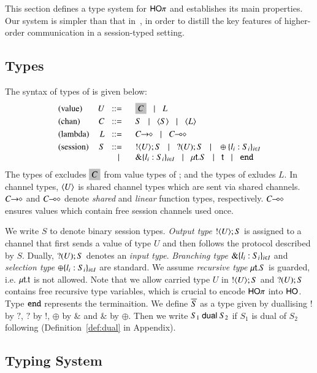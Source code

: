 This section defines a type system for
$\mathsf{HO}\pi$ and establishes its main properties. 
Our system is simpler than that in~\cite{tlca07}, in order to distill the key
features of higher-order communication in a session-typed setting.

\subsection{Types}
\label{subsec:types}
The syntax of types of \HOp is given below: 
\[
\begin{array}{lrl}
\text{(value)}	& U \bnfis &	\nonhosyntax{C} \bnfbar L\\[1mm]  %
\text{(chan)}   & C  \bnfis &	S \bnfbar \chtype{S}\bnfbar \chtype{L}
	\\[1mm]
\text{(lambda)} & L \bnfis &	\shot{C} \bnfbar \lhot{C}
	\\[1mm]
\text{(session)} &  S \bnfis & 	\btout{U} S \bnfbar \btinp{U} S 
\bnfbar \btsel{l_i:S_i}_{i \in I} \\ 
 & \bnfbar & \btbra{l_i:S_i}_{i \in I}
	  \bnfbar  \trec{t}{S} \bnfbar \vart{t}  \bnfbar \tinact
\end{array}
\]
The types of \HO excludes $\nonhosyntax{C}$ from 
value types of \HOp; and the types of \sessp exludes $L$. 
In channel types, $\langle U \rangle$ is shared channel types 
which are sent via shared channels. 
$C\!\! \rightarrow\!\! \diamond$ and $C\!\! \multimap\!\! \diamond$ denote
{\em shared} and {\em linear} function types, respectively.
$C\!\! \multimap\!\! \diamond$ \cite{tlca07} ensures values which contain free 
session channels used once. 
 
We write $S$ to denote binary session types.  {\em Output type}
$! \langle U \rangle ; S$ is assigned to a channel that first sends a value of
type $U$ and then follows the protocol described by $S$.  Dually,
$? (U) ; S$ denotes an {\em input type}.  {\em Branching type}
$\& \{l_i:S_i\}_{i \in I}$ and {\em selection type}
$\oplus \{l_i:S_i\}_{i \in I}$ are standard.  We assume {\em recursive
  type} $\mu\mathsf{t}.S$ is guarded, i.e.  $\mu\mathsf{t}.\mathsf{t}$ is not
allowed.  Note that we allow carried type $U$ in $! \langle U \rangle ; S$ and
$? (U) ; S$ contains free recursive type variables, which is crucial
to encode $\mathsf{HO}\pi$ into $\mathsf{HO}$. Type $\mathtt{end}$ represents the
terminaition. We define $\overline{S}$ as a type given by duallising $!$
by $?$, $?$ by $!$, $\oplus$ by $\&$ and $\&$ by $\oplus$. 
Then we write $S_1 \ \mathsf{dual}\  S_2$ if 
$S_1$ is dual of $S_2$ following \cite{TGC14} 
(Definition~\ref{def:dual} in Appendix).

\subsection{Typing System}
\label{subsec:typing}
